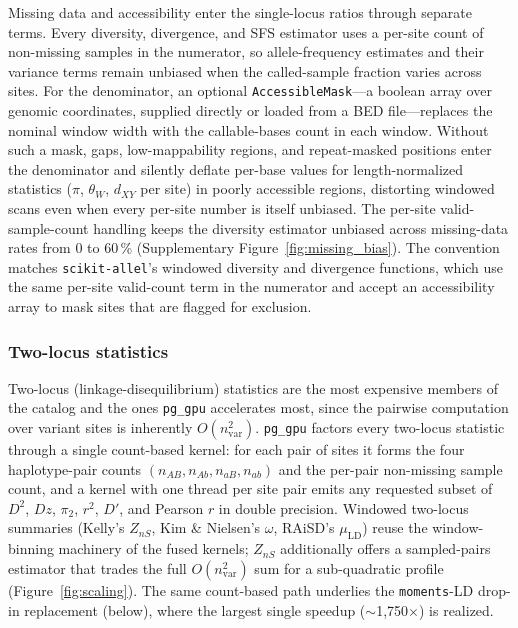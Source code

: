 \documentclass[12pt]{article}
\newcommand{\pggpu}{\texttt{pg\_gpu}\xspace}
\newcommand{\scikitallel}{\texttt{scikit-allel}\xspace}
\newcommand{\moments}{\texttt{moments}\xspace}
\begin{document}
Missing data and accessibility enter the single-locus ratios through
separate terms. Every diversity, divergence, and SFS estimator uses a
per-site count of non-missing samples in the numerator, so
allele-frequency estimates and their variance terms remain unbiased
when the called-sample fraction varies across sites. For the
denominator, an optional \texttt{AccessibleMask}---a boolean array over
genomic coordinates, supplied directly or loaded from a BED
file---replaces the nominal window width with the callable-bases count
in each window. Without such a mask, gaps, low-mappability regions, and
repeat-masked positions enter the denominator and silently deflate
per-base values for length-normalized statistics ($\pi$, $\theta_W$,
$d_{XY}$ per site) in poorly accessible regions, distorting windowed
scans even when every per-site number is itself unbiased. The per-site
valid-sample-count handling keeps the diversity estimator unbiased
across missing-data rates from 0 to 60\,\% (Supplementary
Figure~\ref{fig:missing_bias}). The convention matches
\scikitallel's windowed diversity and divergence functions, which
use the same per-site valid-count term in the numerator and accept
an accessibility array to mask sites that are flagged for exclusion.

\subsubsection*{Two-locus statistics}

Two-locus (linkage-disequilibrium) statistics are the most expensive
members of the catalog and the ones \pggpu accelerates most, since the
pairwise computation over variant sites is inherently
$O(n_{\mathrm{var}}^2)$. \pggpu factors every two-locus statistic
through a single count-based kernel: for each pair of sites it forms
the four haplotype-pair counts $(n_{AB}, n_{Ab}, n_{aB}, n_{ab})$ and
the per-pair non-missing sample count, and a kernel with one thread per
site pair emits any requested subset of $D^2$, $Dz$, $\pi_2$, $r^2$,
$D'$, and Pearson $r$ in double precision. Windowed two-locus summaries
(Kelly's $Z_{nS}$, Kim \& Nielsen's $\omega$, RAiSD's $\mu_{\mathrm{LD}}$)
reuse the window-binning machinery of the fused kernels; $Z_{nS}$
additionally offers a sampled-pairs estimator that trades the full
$O(n_{\mathrm{var}}^2)$ sum for a sub-quadratic profile
(Figure~\ref{fig:scaling}). The same count-based path underlies the
\moments-LD drop-in replacement (below), where the largest single
speedup ($\sim$1{,}750$\times$) is realized.
\end{document}
